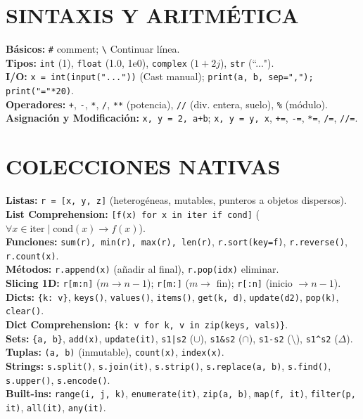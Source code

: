 \section{SINTAXIS Y ARITMÉTICA}
\textbf{Básicos:} \texttt{\#} comment; \texttt{\textbackslash} Continuar línea.\\
\textbf{Tipos:} \texttt{int} (1), \texttt{float} (1.0, 1e0), \texttt{complex} ($1+2j$), \texttt{str} (``..."). \\
\textbf{I/O:} \texttt{x = int(input("..."))} (Cast manual); \texttt{print(a, b, sep=","); print("="*20)}. \\
\textbf{Operadores:} \texttt{+}, \texttt{-}, \texttt{*}, \texttt{/}, \texttt{**} (potencia), \texttt{//} (div. entera, suelo), \texttt{\%} (módulo). \\
\textbf{Asignación y Modificación:} \texttt{x, y = 2, a+b}; \texttt{x, y = y, x}, \texttt{+=}, \texttt{-=}, \texttt{*=}, \texttt{/=}, \texttt{//=}.\\


\section{COLECCIONES NATIVAS} \textbf{Listas:} \texttt{r = [x, y, z]} (heterogéneas, mutables, punteros a objetos dispersos). \\
\textbf{List Comprehension:} \texttt{[f(x) for x in iter if cond]} ($\forall x \in \text{iter} \mid \text{cond}(x) \rightarrow f(x)$).\\
\textbf{Funciones:} \texttt{sum(r), min(r), max(r), len(r)}, \texttt{r.sort(key=f)}, \texttt{r.reverse()}, \texttt{r.count(x)}. \\
\textbf{Métodos:} \texttt{r.append(x)} (añadir al final), \texttt{r.pop(idx)} eliminar.\\
\textbf{Slicing 1D:} \texttt{r[m:n]} ($m \rightarrow n-1$); \texttt{r[m:]} ($m \rightarrow$ fin); \texttt{r[:n]} (inicio $ \rightarrow n - 1$).\\
\textbf{Dicts:} \texttt{\{k: v\}}, \texttt{keys()}, \texttt{values()}, \texttt{items()}, \texttt{get(k, d)}, \texttt{update(d2)}, \texttt{pop(k)}, \texttt{clear()}.\\
\textbf{Dict Comprehension:} \texttt{\{k: v for k, v in zip(keys, vals)\}}.\\
\textbf{Sets:} \texttt{\{a, b\}}, \texttt{add(x)}, \texttt{update(it)}, \texttt{s1|s2} ($\cup$), \texttt{s1\&s2} ($\cap$), \texttt{s1-s2} ($\setminus$), \texttt{s1\^{}s2} ($\Delta$).\\
\textbf{Tuplas:} \texttt{(a, b)} (inmutable), \texttt{count(x)}, \texttt{index(x)}.\\
\textbf{Strings:} \texttt{s.split()}, \texttt{s.join(it)}, \texttt{s.strip()}, \texttt{s.replace(a, b)}, \texttt{s.find()}, \texttt{s.upper()}, \texttt{s.encode()}.\\
\textbf{Built-ins:} \texttt{range(i, j, k)}, \texttt{enumerate(it)}, \texttt{zip(a, b)}, \texttt{map(f, it)}, \texttt{filter(p, it)}, \texttt{all(it)}, \texttt{any(it)}.\\


